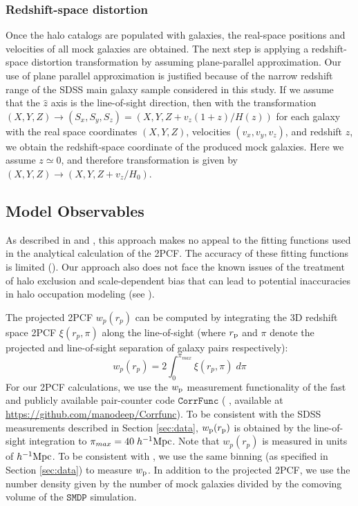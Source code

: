 \documentclass[12pt, preprint]{aastex}
\newcommand{\beq}{\begin{equation}}
\newcommand{\eeq}{\end{equation}}
\begin{document}
\subsubsection{Redshift-space distortion}

Once the halo catalogs are populated with galaxies, the real-space positions and velocities of all mock galaxies are obtained. The next step is applying a redshift-space distortion transformation by assuming plane-parallel approximation.
Our use of plane parallel approximation is justified because of the narrow redshift range of the SDSS main galaxy sample considered in this study.
If we assume that the $\hat{z}$ axis is the line-of-sight direction, then with the transformation $(X,Y,Z) \rightarrow (S_x,S_y,S_z) = (X , Y ,Z + v_{z}(1+z)/H(z))$
for each galaxy with the real space coordinates $(X,Y,Z)$, velocities $(v_x,v_y,v_z)$, and redshift $z$, we obtain the redshift-space coordinate of the produced mock galaxies. Here we assume $z \simeq 0$, and therefore transformation is given by $(X,Y,Z) \rightarrow (X,Y,Z+v_{z}/H_{0})$.   

\subsection{Model Observables}

As described in \citet{decorated} and \citet{2016arXiv160701782H}, this approach makes no appeal to the fitting functions used in the analytical calculation of the 2PCF. The accuracy of these fitting functions is limited (\citealt{tinker08,tinker10,watson13}). Our approach also does not face the known issues of the treatment of halo exclusion and scale-dependent bias that can lead to potential inaccuracies in halo occupation modeling (see \citealt{vdb13}). 

The projected 2PCF $w_{p}(r_{p})$ can be computed by integrating the 3D redshift space 2PCF $\xi(r_{p} , \pi)$ along the line-of-sight (where $r_{\rm p}$ and $\pi$ denote the projected and line-of-sight separation of galaxy pairs respectively):
\beq
w_{p}(r_{p}) = 2 \int_{0}^{\pi_{max}}\xi(r_{p} , \pi)\; d\pi
\label{los}
\eeq
For our 2PCF calculations, we use the $w_{\rm p}$ measurement functionality of the fast and publicly available pair-counter code $\mathtt{CorrFunc}$ (\citealt{corrfunc} , available at \url{https://github.com/manodeep/Corrfunc}). To be consistent with the SDSS measurements described in Section \ref{sec:data}, $w_{\rm{p}}(r_{\rm{p}})$ is obtained by the line-of-sight integration to $\pi_{max}=40 \; h^{-1}\rm{Mpc}$. Note that $w_{p}(r_{p})$ is measured in units of $h^{-1}\rm{Mpc}$. To be consistent with \citet{guo2015}, we use the same binning (as specified in Section \ref{sec:data}) to measure $w_{\rm p}$. In addition to the projected 2PCF, we use the number density given by the number of mock galaxies divided by the comoving volume of the $\mathtt{SMDP}$ simulation. 
\end{document}
